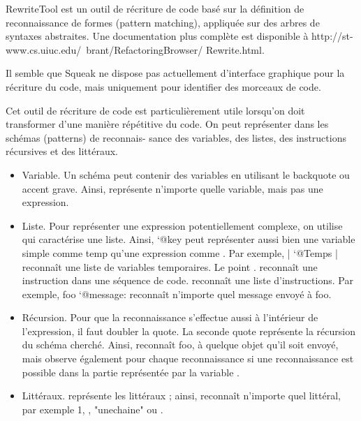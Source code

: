 \documentclass[a4paper,10pt,twoside]{book}
\begin{document}
RewriteTool est un outil de r\'ecriture de code bas\'e sur la d\'efinition
de reconnaissance de formes (pattern matching), appliqu\'ee sur des
arbres de syntaxes abstraites. Une documentation plus compl\`ete est
disponible à http://st-www.cs.uiuc.edu/~brant/RefactoringBrowser/
Rewrite.html.

Il semble que Squeak ne dispose pas actuellement d'interface graphique
pour la r\'ecriture du code, mais uniquement pour identifier des
morceaux de code.


Cet outil de r\'ecriture de code est particuli\`erement utile lorsqu'on
doit transformer d'une mani\`ere r\'ep\'etitive du code. On peut repr\'esenter
dans les sch\'emas (patterns) de reconnais- sance des variables, des
listes, des instructions r\'ecursives et des litt\'eraux.

\begin{itemize}
\item	Variable. Un sch\'ema peut contenir des variables en utilisant
  le backquote ou accent grave. Ainsi,  repr\'esente n'importe
  quelle variable, mais pas une expression.

\item Liste. Pour repr\'esenter une expression potentiellement
  complexe, on utilise  qui caract\'erise une liste. Ainsi, `@key
  peut repr\'esenter aussi bien une variable simple comme temp qu'une
  expression comme . Par exemple, | `@Temps
  | reconnaît une liste de variables temporaires. Le point . reconnaît
  une instruction dans une s\'equence de code.
  reconnaît une liste d'instructions. Par exemple, foo `@message:
   reconnaît n'importe quel message envoy\'e à foo.


\item R\'ecursion. Pour que la reconnaissance s'effectue aussi à
  l'int\'erieur de l'expression, il faut doubler la quote. La seconde
  quote repr\'esente la r\'ecursion du sch\'ema cherch\'e. Ainsi,
   reconnaît foo, à quelque objet qu'il soit envoy\'e,
  mais observe \'egalement pour chaque reconnaissance si une
  reconnaissance est possible dans la partie repr\'esent\'ee par la
  variable .

\item	Litt\'eraux. \ct{\\#} repr\'esente les litt\'eraux ; ainsi, 
  reconnaît n'importe quel litt\'eral, par exemple 1, \ct{\\#()}, "unechaine"
  ou .
\end{itemize}
\end{document}
